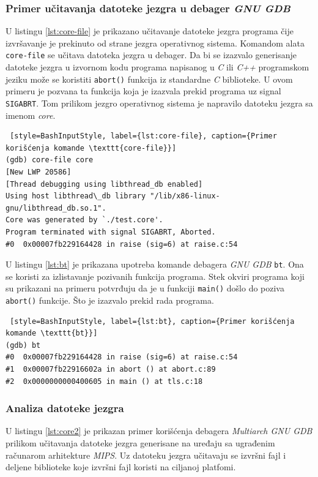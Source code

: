 \documentclass[12pt,oneside]{memoir}
\begin{document}
\subsubsection{Primer učitavanja datoteke jezgra u debager \emph{GNU GDB}}

U listingu \ref{lst:core-file} je prikazano učitavanje datoteke jezgra programa čije izvršavanje je prekinuto od strane jezgra operativnog sistema. Komandom alata \texttt{core-file} se učitava datoteka jezgra u debager. Da bi se izazvalo generisanje datoteke jezgra u izvornom kodu programa napisanog u \emph{C} ili \emph{C++} programskom jeziku može se koristiti \texttt{abort()} funkcija iz standardne \emph{C} biblioteke. U ovom primeru je pozvana ta funkcija koja je izazvala prekid programa uz signal \texttt{SIGABRT}. Tom prilikom jezgro operativnog sistema je napravilo datoteku jezgra sa imenom \emph{core}.
\begin{lstlisting} [style=BashInputStyle, label={lst:core-file}, caption={Primer korišćenja komande \texttt{core-file}}]
(gdb) core-file core
[New LWP 20586]
[Thread debugging using libthread_db enabled]
Using host libthread\_db library "/lib/x86-linux-gnu/libthread_db.so.1".
Core was generated by `./test.core'.
Program terminated with signal SIGABRT, Aborted.
#0  0x00007fb229164428 in raise (sig=6) at raise.c:54
\end{lstlisting}


U listingu \ref{lst:bt} je prikazana upotreba komande debagera \emph{GNU GDB} \texttt{bt}. Ona se koristi za izlistavanje pozivanih funkcija programa. Stek okviri programa koji su prikazani na primeru potvrđuju da je u funkciji \texttt{main()} došlo do poziva \texttt{abort()} funkcije. Što je izazvalo prekid rada programa.

\begin{lstlisting} [style=BashInputStyle, label={lst:bt}, caption={Primer korišćenja komande \texttt{bt}}]
(gdb) bt
#0  0x00007fb229164428 in raise (sig=6) at raise.c:54
#1  0x00007fb22916602a in abort () at abort.c:89
#2  0x0000000000400605 in main () at tls.c:18
\end{lstlisting}

\subsubsection{Analiza datoteke jezgra}

U listingu \ref{lst:core2} je prikazan primer korišćenja debagera \emph{Multiarch GNU GDB} prilikom učitavanja datoteke jezgra generisane na uređaju sa ugrađenim računarom arhitekture \emph{MIPS}. Uz datoteku jezgra učitavaju se izvršni fajl i deljene biblioteke koje izvršni fajl koristi na ciljanoj platfomi.\newpage
\end{document}
